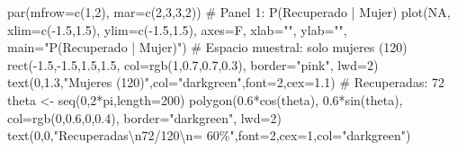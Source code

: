 \documentclass[
  letterpaper,
  DIV=11,
  numbers=noendperiod]{scrartcl}
\newenvironment{Shaded}{\begin{snugshade}}{\end{snugshade}}
\newcommand{\AttributeTok}[1]{\textcolor[rgb]{0.40,0.45,0.13}{#1}}
\newcommand{\CommentTok}[1]{\textcolor[rgb]{0.37,0.37,0.37}{#1}}
\newcommand{\ConstantTok}[1]{\textcolor[rgb]{0.56,0.35,0.01}{#1}}
\newcommand{\DecValTok}[1]{\textcolor[rgb]{0.68,0.00,0.00}{#1}}
\newcommand{\FloatTok}[1]{\textcolor[rgb]{0.68,0.00,0.00}{#1}}
\newcommand{\FunctionTok}[1]{\textcolor[rgb]{0.28,0.35,0.67}{#1}}
\newcommand{\NormalTok}[1]{\textcolor[rgb]{0.00,0.23,0.31}{#1}}
\newcommand{\OtherTok}[1]{\textcolor[rgb]{0.00,0.23,0.31}{#1}}
\newcommand{\SpecialCharTok}[1]{\textcolor[rgb]{0.37,0.37,0.37}{#1}}
\newcommand{\StringTok}[1]{\textcolor[rgb]{0.13,0.47,0.30}{#1}}
\begin{document}
\begin{Shaded}
\begin{Highlighting}[]
\FunctionTok{par}\NormalTok{(}\AttributeTok{mfrow=}\FunctionTok{c}\NormalTok{(}\DecValTok{1}\NormalTok{,}\DecValTok{2}\NormalTok{), }\AttributeTok{mar=}\FunctionTok{c}\NormalTok{(}\DecValTok{2}\NormalTok{,}\DecValTok{3}\NormalTok{,}\DecValTok{3}\NormalTok{,}\DecValTok{2}\NormalTok{))}
\CommentTok{\# Panel 1: P(Recuperado | Mujer)}
\FunctionTok{plot}\NormalTok{(}\ConstantTok{NA}\NormalTok{, }\AttributeTok{xlim=}\FunctionTok{c}\NormalTok{(}\SpecialCharTok{{-}}\FloatTok{1.5}\NormalTok{,}\FloatTok{1.5}\NormalTok{), }\AttributeTok{ylim=}\FunctionTok{c}\NormalTok{(}\SpecialCharTok{{-}}\FloatTok{1.5}\NormalTok{,}\FloatTok{1.5}\NormalTok{), }\AttributeTok{axes=}\NormalTok{F, }\AttributeTok{xlab=}\StringTok{""}\NormalTok{, }\AttributeTok{ylab=}\StringTok{""}\NormalTok{,}
     \AttributeTok{main=}\StringTok{"P(Recuperado | Mujer)"}\NormalTok{)}
\CommentTok{\# Espacio muestral: solo mujeres (120)}
\FunctionTok{rect}\NormalTok{(}\SpecialCharTok{{-}}\FloatTok{1.5}\NormalTok{,}\SpecialCharTok{{-}}\FloatTok{1.5}\NormalTok{,}\FloatTok{1.5}\NormalTok{,}\FloatTok{1.5}\NormalTok{, }\AttributeTok{col=}\FunctionTok{rgb}\NormalTok{(}\DecValTok{1}\NormalTok{,}\FloatTok{0.7}\NormalTok{,}\FloatTok{0.7}\NormalTok{,}\FloatTok{0.3}\NormalTok{), }\AttributeTok{border=}\StringTok{"pink"}\NormalTok{, }\AttributeTok{lwd=}\DecValTok{2}\NormalTok{)}
\FunctionTok{text}\NormalTok{(}\DecValTok{0}\NormalTok{,}\FloatTok{1.3}\NormalTok{,}\StringTok{"Mujeres (120)"}\NormalTok{,}\AttributeTok{col=}\StringTok{"darkgreen"}\NormalTok{,}\AttributeTok{font=}\DecValTok{2}\NormalTok{,}\AttributeTok{cex=}\FloatTok{1.1}\NormalTok{)}
\CommentTok{\# Recuperadas: 72}
\NormalTok{theta }\OtherTok{\textless{}{-}} \FunctionTok{seq}\NormalTok{(}\DecValTok{0}\NormalTok{,}\DecValTok{2}\SpecialCharTok{*}\NormalTok{pi,}\AttributeTok{length=}\DecValTok{200}\NormalTok{)}
\FunctionTok{polygon}\NormalTok{(}\FloatTok{0.6}\SpecialCharTok{*}\FunctionTok{cos}\NormalTok{(theta), }\FloatTok{0.6}\SpecialCharTok{*}\FunctionTok{sin}\NormalTok{(theta), }\AttributeTok{col=}\FunctionTok{rgb}\NormalTok{(}\DecValTok{0}\NormalTok{,}\FloatTok{0.6}\NormalTok{,}\DecValTok{0}\NormalTok{,}\FloatTok{0.4}\NormalTok{), }\AttributeTok{border=}\StringTok{"darkgreen"}\NormalTok{, }\AttributeTok{lwd=}\DecValTok{2}\NormalTok{)}
\FunctionTok{text}\NormalTok{(}\DecValTok{0}\NormalTok{,}\DecValTok{0}\NormalTok{,}\StringTok{"Recuperadas}\SpecialCharTok{\textbackslash{}n}\StringTok{72/120}\SpecialCharTok{\textbackslash{}n}\StringTok{= 60\%"}\NormalTok{,}\AttributeTok{font=}\DecValTok{2}\NormalTok{,}\AttributeTok{cex=}\DecValTok{1}\NormalTok{,}\AttributeTok{col=}\StringTok{"darkgreen"}\NormalTok{)}


\end{Highlighting}
\end{Shaded}
\end{document}
